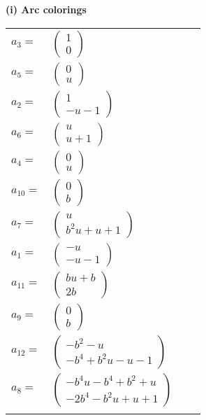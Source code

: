 \documentclass[1p]{elsarticle_modified}
\theoremstyle{definition}
\begin{document}
\flushleft \textbf{(i) Arc colorings}\\
\begin{tabular}{m{7pt} m{180pt} m{7pt} m{180pt} }
\flushright $a_{3}=$&$\begin{pmatrix}1\\0\end{pmatrix}$ \\
\flushright $a_{5}=$&$\begin{pmatrix}0\\u\end{pmatrix}$ \\
\flushright $a_{2}=$&$\begin{pmatrix}1\\- u-1\end{pmatrix}$ \\
\flushright $a_{6}=$&$\begin{pmatrix}u\\u+1\end{pmatrix}$ \\
\flushright $a_{4}=$&$\begin{pmatrix}0\\u\end{pmatrix}$ \\
\flushright $a_{10}=$&$\begin{pmatrix}0\\b\end{pmatrix}$ \\
\flushright $a_{7}=$&$\begin{pmatrix}u\\b^2 u+u+1\end{pmatrix}$ \\
\flushright $a_{1}=$&$\begin{pmatrix}- u\\- u-1\end{pmatrix}$ \\
\flushright $a_{11}=$&$\begin{pmatrix}b u+b\\2 b\end{pmatrix}$ \\
\flushright $a_{9}=$&$\begin{pmatrix}0\\b\end{pmatrix}$ \\
\flushright $a_{12}=$&$\begin{pmatrix}- b^2- u\\- b^4+b^2 u- u-1\end{pmatrix}$ \\
\flushright $a_{8}=$&$\begin{pmatrix}- b^4 u- b^4+b^2+u\\-2 b^4- b^2 u+u+1\end{pmatrix}$\\&\end{tabular}
\end{document}
